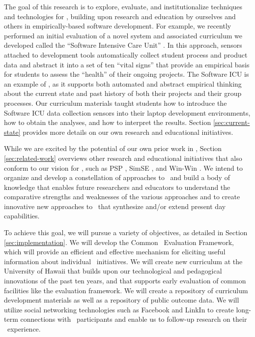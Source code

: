 The goal of this research is to explore, evaluate, and institutionalize
techniques and technologies for \eCT, building upon research and education
by ourselves and others in empirically-based software development.  For
example, we recently performed an initial evaluation of a novel system and
associated curriculum we developed called the ``Software Intensive Care
Unit'' \citep{csdl2-09-02}.  In this approach, sensors attached to
development tools automatically collect student process and product data
and abstract it into a set of ten ``vital signs'' that provide an empirical
basis for students to assess the ``health'' of their ongoing projects.  The
Software ICU is an example of \eCT, as it supports both automated and
abstract empirical thinking about the current state and past history of
both their projects and their group processes.  Our curriculum materials
taught students how to introduce the Software ICU data collection sensors
into their laptop development environments, how to obtain the analyses, and
how to interpret the results. Section \ref{sec:current-state} provides more
details on our own research and educational initiatives.

While we are excited by the potential of our own prior work in \eCT,
Section \ref{sec:related-work} overviews other research and educational
initiatives that also conform to our vision for \eCT, such as PSP
\citep{Humphrey95}, SimSE \citep{Navarro07}, and Win-Win \citep{Valerdi07}.
We intend to organize and develop a constellation of approaches to \eCT\
and build a body of knowledge that enables future researchers and educators
to understand the comparative strengths and weaknesses of the various
approaches and to create innovative new approaches to \eCT\ that synthesize
and/or extend present day capabilities.

To achieve this goal, we will pursue a variety of objectives, as detailed in 
Section \ref{sec:implementation}.  We will develop the Common \eCT\
Evaluation Framework, which will provide an efficient and effective mechanism
for eliciting useful information about individual \eCT\ initiatives.  
We will create new curriculum at the University of Hawaii that builds
upon our technological and pedagogical innovations of the past ten years, and that 
supports early evaluation of common facilities like the evaluation framework. 
We will create a repository of curriculum development materials as well as a repository
of public outcome data. We will utilize social networking technologies such as
Facebook and LinkIn to create long-term connections with \eCT\ participants 
and enable us to follow-up research on their \eCT\ experience. 


